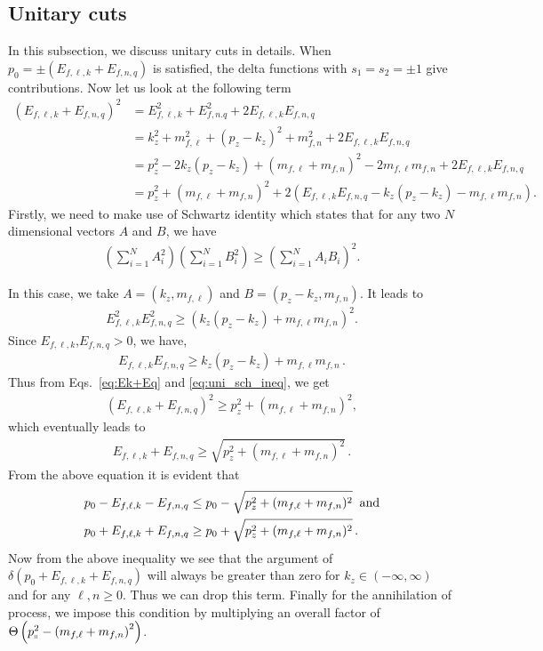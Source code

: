 \documentclass[aps,prd,floatfix,showpacs,showkeys,superscriptadress,unsortedaddress,nofootinbib,onecolumn]{revtex4-1}
\newcommand{\shp}{\shortparallel}
\newcommand{\nn}{\nonumber \\}
\begin{document}
\subsection{Unitary cuts} 
\label{app:unitary_cuts}
In this subsection, we discuss unitary cuts in details. When $p_0=\pm(E_{f,\ell,k}+E_{f,n,q})$ is satisfied, the delta functions with $s_1=s_2=\pm 1$ give contributions.
Now let us look at the following term
\begin{align}
(E_{f,\ell,k}+E_{f,n,q})^2 &= E_{f,\ell,k}^2+E_{f,n.q}^2+2 E_{f,\ell,k}E_{f,n,q} \nn
&= k_z^2+m^2_{f,\ell}+(p_z-k_z)^2+m^2_{f,n}+2 E_{f,\ell,k} E_{f,n,q} \nn
&= p^2_z-2 k_z (p_z-k_z)+(m_{f,\ell}+m_{f,n})^2 - 2m_{f,\ell}m_{f,n}+2 E_{f,\ell,k} E_{f,n,q} \nn
&= p^2_z+(m_{f,\ell}+m_{f,n})^2 + 2 ( E_{f,\ell,k} E_{f,n,q}- k_z (p_z-k_z)-m_{f,\ell}m_{f,n}).
\label{eq:Ek+Eq}
\end{align}
Firstly,  we need to make use of Schwartz identity which states that for any two $N$ dimensional vectors $A$ and $B$, we have 
\begin{align}
\left(\sum_{i=1}^{N} A_i^2\right)\left(\sum_{i=1}^{N} B_i^2\right)\geq \left(\sum_{i=1}^N A_iB_i\right)^2.\label{eq:schwartz_inequality}
\end{align}

In this case, we take 
$A=(k_z,m_{f,\ell})$ and $B=(p_z-k_z,m_{f,n})$. It leads to
\begin{align}
E_{f,\ell,k}^2E_{f,n,q}^2\geq (k_z(p_z-k_z)+m_{f,\ell}m_{f,n})^2. 
\end{align}
Since $E_{f,\ell,k}$,$E_{f,n,q} > 0$, we have,
\begin{align}
E_{f,\ell,k}E_{f,n,q}\geq k_z(p_z-k_z)+m_{f,\ell}m_{f,n}\,.
\label{eq:uni_sch_ineq}
\end{align} 
Thus from Eqs.~\eqref{eq:Ek+Eq} and \eqref{eq:uni_sch_ineq}, we get
\begin{align}
(E_{f,\ell,k}+E_{f,n,q})^2 \geq p^2_z+(m_{f,\ell}+m_{f,n})^2,
\end{align}
which eventually leads to
\begin{align}
E_{f,\ell,k} + E_{f,n,q} \geq \sqrt{p^2_z+(m_{f,\ell}+m_{f,n})^2}\,.
\end{align}
From the above equation it is evident that 
\begin{align} 
p_0 - E_{f,\ell,k} - E_{f,n,q} &\leq p_0 - \sqrt{p^2_z+(m_{f,\ell}+m_{f,n})^2}\;\; {\rm and}\\
p_0 + E_{f,\ell,k} + E_{f,n,q} &\geq p_0 + \sqrt{p^2_z+(m_{f,\ell}+m_{f,n})^2}\,.
\end{align}
Now from the above inequality we see that the argument of $\delta(p_0+E_{f,\ell,k}+E_{f,n,q})$ will always be greater than zero for $k_z\in (-\infty,\infty)$ and for any $\ell,n\geq 0$. Thus we can drop this term.
Finally for the annihilation of process, we impose this condition by multiplying an overall factor of $\Theta\left(p_{\shp}^2-\left(m_{f,\ell}+m_{f,n}\right)^2\right)$.
\end{document}

